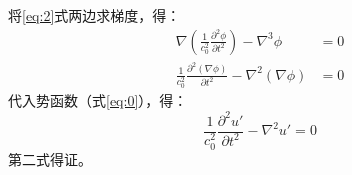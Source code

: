 \noindent 将\eqref{eq:2}式两边求梯度，得：
\begin{equation}
    \begin{aligned}
        \nabla \left(\frac{1}{c_{0}^{2}} \frac{\partial^{2} \phi}{\partial t^{2}}\right)-\nabla^{3} \phi &= 0 \\
        \frac{1}{c_{0}^{2}} \frac{\partial^{2} \left(\nabla \phi\right)}{\partial t^{2}}-\nabla^{2} \left(\nabla \phi\right) &= 0
    \end{aligned}
\end{equation}
代入势函数（式\eqref{eq:0}），得：
\begin{equation}
    \frac{1}{c_{0}^{2}} \frac{\partial^{2} u'}{\partial t^{2}}-\nabla^{2} u'=0
\end{equation}
第二式得证。

\clearpage